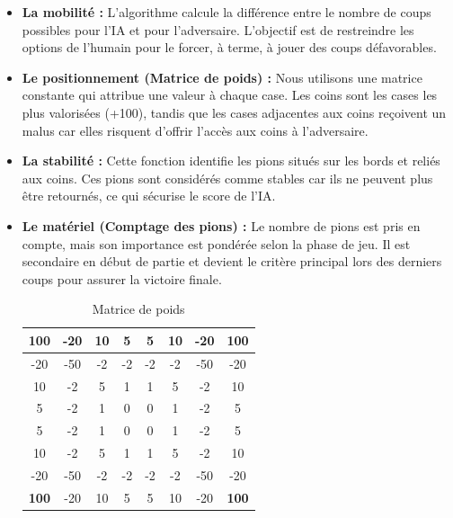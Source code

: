 \documentclass{article}
\begin{document}
\begin{itemize}
    \item \textbf{La mobilité :} L'algorithme calcule la différence entre le nombre de coups possibles pour l'IA et pour l'adversaire. L'objectif est de restreindre les options de l'humain pour le forcer, à terme, à jouer des coups défavorables.

    \item \textbf{Le positionnement (Matrice de poids) :} Nous utilisons une matrice constante qui attribue une valeur à chaque case. Les coins sont les cases les plus valorisées (+100), tandis que les cases adjacentes aux coins reçoivent un malus car elles risquent d'offrir l'accès aux coins à l'adversaire.

    \item \textbf{La stabilité :} Cette fonction identifie les pions situés sur les bords et reliés aux coins. Ces pions sont considérés comme stables car ils ne peuvent plus être retournés, ce qui sécurise le score de l'IA.

    \item \textbf{Le matériel (Comptage des pions) :} Le nombre de pions est pris en compte, mais son importance est pondérée selon la phase de jeu. Il est secondaire en début de partie et devient le critère principal lors des derniers coups pour assurer la victoire finale.

\begin{table}[H]
\centering
\caption{Matrice de poids}
\begin{tabular}{|c|c|c|c|c|c|c|c|}
\hline
\rowcolor{pink!20} \textbf{100} & -20 & 10 & 5 & 5 & 10 & -20 & \textbf{100} \\ \hline
-20 & -50 & -2 & -2 & -2 & -2 & -50 & -20 \\ \hline
10 & -2 & 5 & 1 & 1 & 5 & -2 & 10 \\ \hline
5 & -2 & 1 & 0 & 0 & 1 & -2 & 5 \\ \hline
5 & -2 & 1 & 0 & 0 & 1 & -2 & 5 \\ \hline
10 & -2 & 5 & 1 & 1 & 5 & -2 & 10 \\ \hline
-20 & -50 & -2 & -2 & -2 & -2 & -50 & -20 \\ \hline
\rowcolor{pink!20} \textbf{100} & -20 & 10 & 5 & 5 & 10 & -20 & \textbf{100} \\ \hline
\end{tabular}
\end{table}
\end{itemize}

\vspace{0.3cm}
\end{document}
